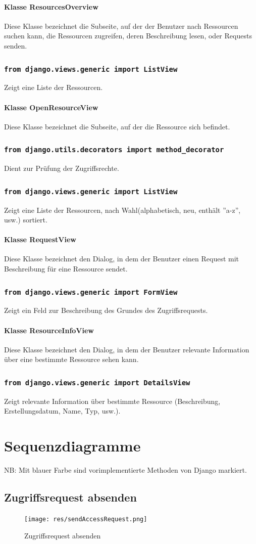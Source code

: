 \documentclass[parskip=full,11pt]{scrartcl}
\newcommand{\class}[1]{\subsubsection*{\lstinline[basicstyle=\ttfamily\large]{#1}}}
\begin{document}
\paragraph*{Klasse ResourcesOverview}
Diese Klasse bezeichnet die Subseite, auf der der Benutzer nach Ressourcen suchen kann, die Ressourcen zugreifen, deren Beschreibung lesen, oder Requests senden.
\class{from django.views.generic import ListView}
Zeigt eine Liste der Ressourcen.

\paragraph*{Klasse OpenResourceView}
Diese Klasse bezeichnet die Subseite, auf der die Ressource sich befindet.
\class{from django.utils.decorators import method_decorator}
Dient zur Prüfung der Zugriffsrechte.
\class{from django.views.generic import ListView}
Zeigt eine Liste der Ressourcen, nach Wahl(alphabetisch, neu, enthält ''a-z'', usw.) sortiert.

\paragraph*{Klasse RequestView}
Diese Klasse bezeichnet den Dialog, in dem der Benutzer einen Request mit Beschreibung für eine Ressource sendet.
\class{from django.views.generic import FormView}
Zeigt ein Feld zur Beschreibung des Grundes des Zugriffsrequests.

\paragraph*{Klasse ResourceInfoView}
Diese Klasse bezeichnet den Dialog, in dem der Benutzer relevante Information über eine bestimmte Ressource sehen kann.
\class{from django.views.generic import DetailsView}
Zeigt relevante Information über bestimmte Ressource (Beschreibung, Erstellungsdatum, Name, Typ, usw.).
\newpage
 \section{Sequenzdiagramme}
 NB: Mit blauer Farbe sind vorimplementierte Methoden von Django markiert.
 \subsection{Zugriffsrequest absenden}
 \begin{figure}[ht!]
 	\centering
 	\texttt{[image: res/sendAccessRequest.png]}
 	\caption{Zugriffsrequest absenden}
 	\label{fig:sendAccReq}
 \end{figure}
 
\end{document}
